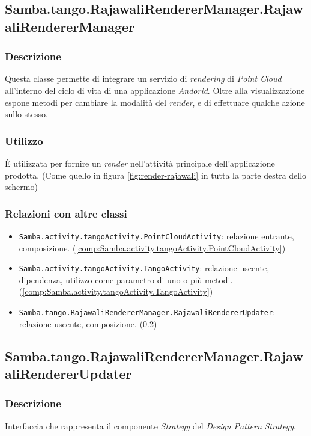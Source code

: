 \subsection{Samba.tango.RajawaliRendererManager.RajawaliRendererManager}\label{comp:Samba.tango.RajawaliRendererManager.RajawaliRendererManager}
\subsubsection{Descrizione}
Questa classe permette di integrare un servizio di \emph{rendering} di \emph{Point Cloud} all'interno del ciclo di vita di una applicazione \emph{Andorid}. Oltre alla visualizzazione espone metodi per cambiare la modalità del \emph{render}, e di effettuare qualche azione sullo stesso.
\subsubsection{Utilizzo}
È utilizzata per fornire un \emph{render} nell'attività principale dell'applicazione prodotta. (Come quello in figura \ref{fig:render-rajawali} in tutta la parte destra dello schermo)
\subsubsection{Relazioni con altre classi}
\begin{itemize}
	\item \texttt{Samba.activity.tangoActivity.PointCloudActivity}: relazione entrante, composizione. (\ref{comp:Samba.activity.tangoActivity.PointCloudActivity})
	\item \texttt{Samba.activity.tangoActivity.TangoActivity}: relazione uscente, dipendenza, utilizzo come parametro di uno o più metodi. (\ref{comp:Samba.activity.tangoActivity.TangoActivity})
	\item \texttt{Samba.tango.RajawaliRendererManager.RajawaliRendererUpdater}: relazione uscente, composizione. (\ref{comp:Samba.tango.RajawaliRendererManager.RajawaliRendererUpdater})
\end{itemize}

\subsection{Samba.tango.RajawaliRendererManager.RajawaliRendererUpdater}\label{comp:Samba.tango.RajawaliRendererManager.RajawaliRendererUpdater}
\subsubsection{Descrizione}
Interfaccia che rappresenta il componente \emph{Strategy} del \emph{Design Pattern} \emph{Strategy}.

